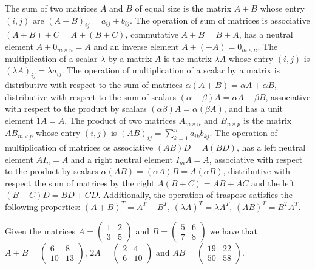 The sum of two matrices $A$ and $B$ of equal size is the matrix $A + B$ whose entry $(i, j)$ are $(A + B)_{ij} = a_{ij} + b_{ij}$. The operation of sum of matrices is associative $(A + B) + C = A + (B + C)$, commutative $A + B = B + A$, has a neutral element $A + 0_{m \times n} = A$ and an inverse element $A + (-A) = 0_{m \times n}$. The multiplication of a scalar $\lambda$ by a matrix $A$ is the matrix $\lambda A$ whose entry $(i, j)$ is $(\lambda A)_{ij} = \lambda a_{ij}$. The operation of multiplication of a scalar by a matrix is distributive with respect to the sum of matrices $\alpha (A + B) = \alpha A + \alpha B$, distributive with respect to the sum of scalars $(\alpha + \beta) A = \alpha A + \beta B$, associative with respect to the product by scalars $(\alpha \beta) A = \alpha (\beta A)$, and has a unit element $1 A = A$. The product of two matrices $A_{m \times n}$ and $B_{n \times p}$ is the matrix $AB_{m \times p}$ whose entry $(i, j)$ is $(AB)_{ij} = \sum_{k=1}^n a_{ik} b_{kj}$. The operation of multiplication of matrices os associative $(A B) D = A (B D)$, has a left neutral element $A I_n = A$ and a right neutral element $I_m A = A$, associative with respect to the product by scalars $\alpha (A B) = (\alpha A) B = A (\alpha B)$, distributive with respect the sum of matrices by the right $A (B + C) = AB + AC$ and the left $(B + C) D = B D + C D$. Additionally, the operation of traspose satisfies the following properties: $(A + B)^T = A^T + B^T$, $(\lambda A)^T = \lambda A^T$, $(A B)^T = B^T A^T$.

\begin{example}
Given the matrices $A = \left( \begin{smallmatrix} 1 & 2 \\ 3 & 5 \end{smallmatrix} \right)$ and $B = \left( \begin{smallmatrix} 5 & 6 \\ 7 & 8 \end{smallmatrix} \right)$ we have that $A + B = \left( \begin{smallmatrix} 6 & 8 \\ 10 & 13 \end{smallmatrix} \right)$, $2 A = \left( \begin{smallmatrix} 2 & 4 \\ 6 & 10 \end{smallmatrix} \right)$ and $A B = \left( \begin{smallmatrix} 19 & 22 \\ 50 & 58 \end{smallmatrix} \right)$.
\end{example}


